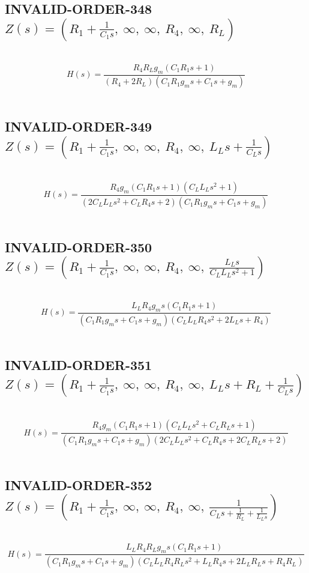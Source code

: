 \documentclass{article}
\begin{document}
\subsection{INVALID-ORDER-348 $Z(s) = \left( R_{1} + \frac{1}{C_{1} s}, \  \infty, \  \infty, \  R_{4}, \  \infty, \  R_{L}\right)$ } \ 
\textbf{\[H(s) = \frac{R_{4} R_{L} g_{m} \left(C_{1} R_{1} s + 1\right)}{\left(R_{4} + 2 R_{L}\right) \left(C_{1} R_{1} g_{m} s + C_{1} s + g_{m}\right)}\] } \ 
\subsection{INVALID-ORDER-349 $Z(s) = \left( R_{1} + \frac{1}{C_{1} s}, \  \infty, \  \infty, \  R_{4}, \  \infty, \  L_{L} s + \frac{1}{C_{L} s}\right)$ } \ 
\textbf{\[H(s) = \frac{R_{4} g_{m} \left(C_{1} R_{1} s + 1\right) \left(C_{L} L_{L} s^{2} + 1\right)}{\left(2 C_{L} L_{L} s^{2} + C_{L} R_{4} s + 2\right) \left(C_{1} R_{1} g_{m} s + C_{1} s + g_{m}\right)}\] } \ 
\subsection{INVALID-ORDER-350 $Z(s) = \left( R_{1} + \frac{1}{C_{1} s}, \  \infty, \  \infty, \  R_{4}, \  \infty, \  \frac{L_{L} s}{C_{L} L_{L} s^{2} + 1}\right)$ } \ 
\textbf{\[H(s) = \frac{L_{L} R_{4} g_{m} s \left(C_{1} R_{1} s + 1\right)}{\left(C_{1} R_{1} g_{m} s + C_{1} s + g_{m}\right) \left(C_{L} L_{L} R_{4} s^{2} + 2 L_{L} s + R_{4}\right)}\] } \ 
\subsection{INVALID-ORDER-351 $Z(s) = \left( R_{1} + \frac{1}{C_{1} s}, \  \infty, \  \infty, \  R_{4}, \  \infty, \  L_{L} s + R_{L} + \frac{1}{C_{L} s}\right)$ } \ 
\textbf{\[H(s) = \frac{R_{4} g_{m} \left(C_{1} R_{1} s + 1\right) \left(C_{L} L_{L} s^{2} + C_{L} R_{L} s + 1\right)}{\left(C_{1} R_{1} g_{m} s + C_{1} s + g_{m}\right) \left(2 C_{L} L_{L} s^{2} + C_{L} R_{4} s + 2 C_{L} R_{L} s + 2\right)}\] } \ 
\subsection{INVALID-ORDER-352 $Z(s) = \left( R_{1} + \frac{1}{C_{1} s}, \  \infty, \  \infty, \  R_{4}, \  \infty, \  \frac{1}{C_{L} s + \frac{1}{R_{L}} + \frac{1}{L_{L} s}}\right)$ } \ 
\textbf{\[H(s) = \frac{L_{L} R_{4} R_{L} g_{m} s \left(C_{1} R_{1} s + 1\right)}{\left(C_{1} R_{1} g_{m} s + C_{1} s + g_{m}\right) \left(C_{L} L_{L} R_{4} R_{L} s^{2} + L_{L} R_{4} s + 2 L_{L} R_{L} s + R_{4} R_{L}\right)}\] } \ 
\end{document}
